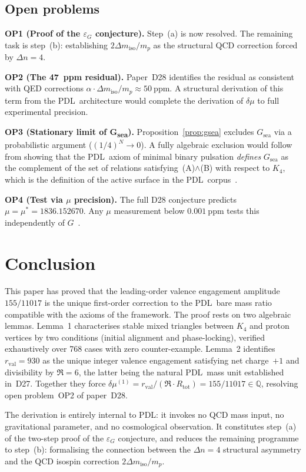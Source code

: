 \documentclass[11pt,a4paper]{article}
\theoremstyle{definition}
\newcommand{\PDL}{\textnormal{PDL}}
\newcommand{\Rtot}{R_{\mathrm{tot}}}
\newcommand{\rval}{r_{\mathrm{val}}}
\newcommand{\epsg}{\varepsilon_G}
\newcommand{\Kfour}{K_4}
\newcommand{\dmu}{\delta\mu}
\newcommand{\dmiso}{\Delta m_{\mathrm{iso}}}
\newcommand{\Gsea}{G_{\mathrm{sea}}}
\begin{document}
\subsection{Open problems}

\medskip\noindent\textbf{OP1 (Proof of the $\epsg$ conjecture).} Step~(a) is now resolved. The remaining task is step~(b): establishing $2\dmiso/m_p$ as the structural QCD correction forced by $\Delta n = 4$.

\medskip\noindent\textbf{OP2 (The 47~ppm residual).} Paper~D28 identifies the residual as consistent with QED corrections $\alpha\cdot\dmiso/m_p \approx 50~\mathrm{ppm}$. A structural derivation of this term from the \PDL\ architecture would complete the derivation of $\dmu$ to full experimental precision.

\medskip\noindent\textbf{OP3 (Stationary limit of G\textsubscript{sea}).} Proposition~\ref{prop:gsea} excludes $\Gsea$ via a probabilistic argument ($(1/4)^N \to 0$). A fully algebraic exclusion would follow from showing that the \PDL\ axiom of minimal binary pulsation \emph{defines} $\Gsea$ as the complement of the set of relations satisfying~(A)$\wedge$(B) with respect to $\Kfour$, which is the definition of the active surface in the \PDL\ corpus~\cite{PDL_Main_2026}.

\medskip\noindent\textbf{OP4 (Test via $\mu$ precision).} The full D28 conjecture predicts $\mu = \mu^* = 1836.152670$. Any $\mu$ measurement below $0.001~\mathrm{ppm}$ tests this independently of $G$~\cite{Alighanbari_2025}.

\section*{Conclusion}

This paper has proved that the leading-order valence engagement amplitude $155/11017$ is the unique first-order correction to the \PDL\ bare mass ratio compatible with the axioms of the framework. The proof rests on two algebraic lemmas. Lemma~1 characterises stable mixed triangles between $\Kfour$ and proton vertices by two conditions (initial alignment and phase-locking), verified exhaustively over 768 cases with zero counter-example. Lemma~2 identifies $\rval = 930$ as the unique integer valence engagement satisfying net charge~$+1$ and divisibility by $\Re = 6$, the latter being the natural \PDL\ mass unit established in~D27. Together they force $\dmu^{(1)} = \rval/(\Re\cdot\Rtot) = 155/11017 \in \mathbb{Q}$, resolving open problem~OP2 of paper~D28.

The derivation is entirely internal to \PDL: it invokes no QCD mass input, no gravitational parameter, and no cosmological observation. It constitutes step~(a) of the two-step proof of the $\epsg$ conjecture, and reduces the remaining programme to step~(b): formalising the connection between the $\Delta n = 4$ structural asymmetry and the QCD isospin correction $2\dmiso/m_p$.



\end{document}
